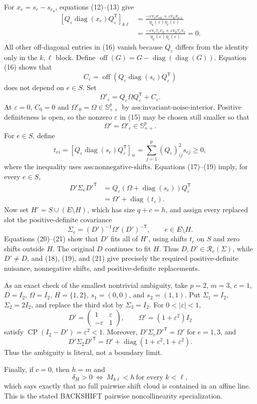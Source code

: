 For \(x_e=s_e-s_{e_0}\), equations (12)--(13) give
\[
 \begin{aligned}
 [Q_\varepsilon\operatorname{diag}(x_e)Q_\varepsilon^{\mathsf T}]_{k\ell}
 &=\frac{-\varepsilon v_\ell x_{ek}+\varepsilon v_kx_{e\ell}}
 {\eta_k(\varepsilon)\eta_\ell(\varepsilon)}\\
 &=\frac{-\varepsilon v_\ell\tau_ev_k+\varepsilon v_k\tau_ev_\ell}
 {\eta_k(\varepsilon)\eta_\ell(\varepsilon)}=0.
 \end{aligned} \tag{16}
\]
All other off-diagonal entries in (16) vanish because \(Q_\varepsilon\) differs from the identity only in the \(k,\ell\) block.  Define \(\operatorname{off}(G)=G-\operatorname{diag}(\operatorname{diag}(G))\).  Equation (16) shows that
\[
 C_\varepsilon
 =\operatorname{off}\!\left(Q_\varepsilon\operatorname{diag}(s_e)Q_\varepsilon^{\mathsf T}\right)
\]
does not depend on \(e\in S\).  Set
\[
 \Omega'_\varepsilon=Q_\varepsilon\Omega Q_\varepsilon^{\mathsf T}+C_\varepsilon. \tag{17}
\]
At \(\varepsilon=0\), \(C_0=0\) and \(\Omega'_0=\Omega\in\mathbb S_{++}^p\) by \(\text{ass:invariant-noise-interior}\).  Positive definiteness is open, so the nonzero \(\varepsilon\) in (15) may be chosen still smaller so that
\[
 \Omega'=\Omega'_\varepsilon\in\mathbb S_{++}^p. \tag{18}
\]
For \(e\in S\), define
\[
 t_{ei}=[Q_\varepsilon\operatorname{diag}(s_e)Q_\varepsilon^{\mathsf T}]_{ii}
 =\sum_{j=1}^p(Q_\varepsilon)_{ij}^2s_{ej}\ge0, \tag{19}
\]
where the inequality uses \(\text{ass:nonnegative-shifts}\).  Equations (17)--(19) imply, for every \(e\in S\),
\[
 \begin{aligned}
 D'\Sigma_eD'^{\mathsf T}
 &=Q_\varepsilon(\Omega+\operatorname{diag}(s_e))Q_\varepsilon^{\mathsf T}\\
 &=\Omega'+\operatorname{diag}(t_e).
 \end{aligned} \tag{20}
\]
Now set \(H'=S\cup(E\setminus H)\), which has size \(q+c=h\), and assign every replaced slot the positive-definite covariance
\[
 \Sigma_e=(D')^{-1}\Omega'(D')^{-\mathsf T},\qquad e\in E\setminus H. \tag{21}
\]
Equations (20)--(21) show that \(D'\) fits all of \(H'\), using shifts \(t_e\) on \(S\) and zero shifts outside \(H\).  The original \(D\) continues to fit \(H\).  Thus \(D,D'\in\mathcal R_c(\Sigma)\), while \(D'\ne D\), and (18), (19), and (21) give precisely the required positive-definite nuisance, nonnegative shifts, and positive-definite replacements.

As an exact check of the smallest nontrivial ambiguity, take \(p=2\), \(m=3\), \(c=1\), \(D=I_2\), \(\Omega=I_2\), \(H=\{1,2\}\), \(s_1=(0,0)\), and \(s_2=(1,1)\).  Put \(\Sigma_1=I_2\), \(\Sigma_2=2I_2\), and replace the third slot by \(\Sigma_3=I_2\).  For \(0<|\varepsilon|<1\),
\[
 D'=\begin{pmatrix}1&\varepsilon\\-\varepsilon&1\end{pmatrix},\qquad
 \Omega'=(1+\varepsilon^2)I_2
\]
satisfy \(\operatorname{CP}(I_2-D')=\varepsilon^2<1\).  Moreover, \(D'\Sigma_eD'^{\mathsf T}=\Omega'\) for \(e=1,3\), and
\[
 D'\Sigma_2D'^{\mathsf T}
 =\Omega'+\operatorname{diag}(1+\varepsilon^2,1+\varepsilon^2).
\]
Thus the ambiguity is literal, not a boundary limit.

Finally, if \(c=0\), then \(h=m\) and
\[
 \delta_H>0
 \ \Longleftrightarrow\ M_{k\ell}<h\ \text{for every }k<\ell,
\]
which says exactly that no full pairwise shift cloud is contained in an affine line.  This is the stated BACKSHIFT pairwise noncollinearity specialization.